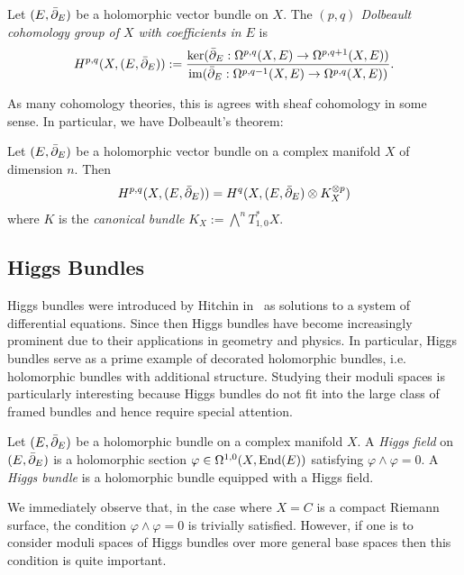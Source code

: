 \documentclass[12pt]{ociamthesis}  %
\begin{document}
\begin{definition}
  Let $(E,{\bar{\partial}}_E)$ be a holomorphic vector bundle on $X$. The
  \emph{$(p,q)$ Dolbeault cohomology group of $X$ with coefficients in
    $E$} is
  \begin{align*}
    H^{p,q}(X,(E,{\bar{\partial}}_E)) := \frac{
      \ker({\bar{\partial}}_E : \Omega^{p,q}(X,E) \to \Omega^{p,q+1}(X,E))
    }{
      \operatorname{im}({\bar{\partial}}_E : \Omega^{p,q-1}(X,E) \to \Omega^{p,q}(X,E))
    }.
  \end{align*}
\end{definition}

As many cohomology theories, this is agrees with sheaf cohomology
in some sense. In particular, we have Dolbeault's theorem:

\begin{theorem}[Dolbeault]\label{thm:dolbeault}
  Let $(E,{\bar{\partial}}_E)$ be a holomorphic vector bundle on a complex manifold
  $X$ of dimension $n$. Then
  \begin{align*}
    H^{p,q}(X,(E,{\bar{\partial}}_E)) = H^q(X,(E,{\bar{\partial}}_E)\otimes K^{\otimes p}_X)
  \end{align*}
  where $K$ is the \emph{canonical bundle}
  $K_X := \bigwedge^n T_{1,0}^* X$.
\end{theorem}

\subsection{Higgs Bundles}

Higgs bundles were introduced by Hitchin in~\cite{hitchin1987}
as solutions to a system of differential equations. Since then
Higgs bundles have become increasingly prominent due to their applications
in geometry and physics. In particular, Higgs bundles serve as a
prime example of decorated holomorphic bundles, i.e. holomorphic bundles
with additional structure. Studying their moduli spaces is particularly
interesting because Higgs bundles do not fit into the large class of framed
bundles and hence require special attention.~\cite[Example 4.B.3]{huybrechts2010}

\begin{definition}
  Let $(E,{\bar{\partial}}_E)$ be a holomorphic bundle on a complex manifold $X$.
  A \emph{Higgs field} on $(E,{\bar{\partial}}_E)$ is a holomorphic section
  $\varphi \in \Omega^{1,0}(X,\operatorname{End}(E))$ satisfying $\varphi\wedge\varphi = 0$.
  A \emph{Higgs bundle} is a holomorphic bundle equipped with
  a Higgs field.
\end{definition}
We immediately observe that, in the case where $X=C$ is a compact
Riemann surface, the condition $\varphi\wedge\varphi=0$ is trivially
satisfied. However, if one is to consider moduli spaces of Higgs bundles
over more general base spaces then this condition is quite important.
\end{document}
